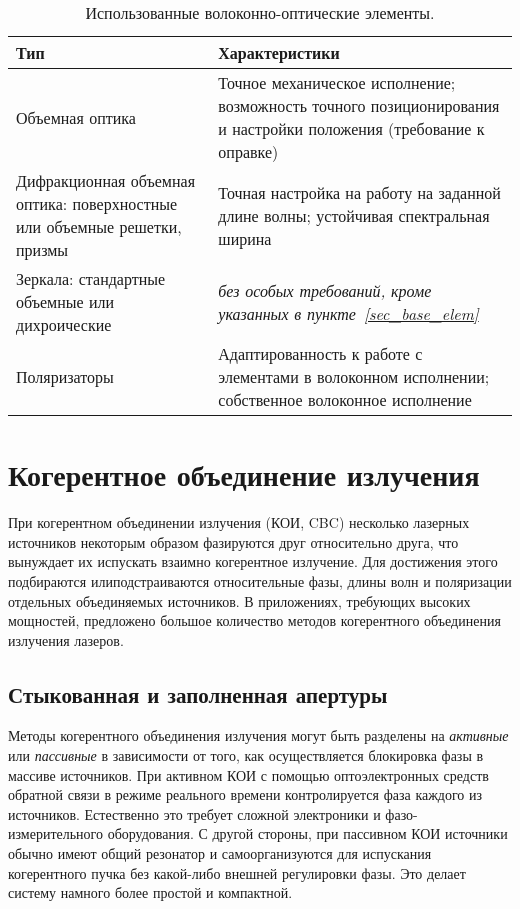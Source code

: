 \begin{table} [htbp]
  \centering
  \parbox{16cm}{\caption{{Использованные волоконно-оптические элементы.}}
  \label{tbl_nrl_4}}
  \begin{center}
  \begin{tabular}{ | p{6cm} | p{9cm} |}
  \hline
  \hline
  Тип & Характеристики \\
  \hline
  \hline
    Объемная оптика & Точное механическое исполнение; возможность точного позиционирования и настройки положения (требование к оправке) \\
  \hline
    Дифракционная объемная оптика: поверхностные или объемные решетки, призмы & Точная настройка на работу на заданной длине волны; устойчивая спектральная ширина \\
  \hline
    Зеркала: стандартные объемные или дихроические & \textit{без особых требований, кроме указанных в пункте~\ref{sec_base_elem}}\\
  \hline
    Поляризаторы & Адаптированность к работе с элементами в волоконном исполнении; собственное волоконное исполнение\\
  \hline
  \end{tabular}
\end{center}
\end{table}

\section{Когерентное объединение излучения}


При когерентном объединении излучения (КОИ, CBC) несколько лазерных источников некоторым образом фазируются друг относительно друга, что вынуждает их испускать взаимно когерентное излучение. Для достижения этого подбираются илиподстраиваются относительные фазы, длины волн и поляризации отдельных объединяемых источников. В приложениях, требующих высоких мощностей, предложено большое количество методов когерентного объединения излучения лазеров.

\subsection{Стыкованная и заполненная апертуры}

Методы когерентного объединения излучения могут быть разделены на \textit{активные} или \textit{пассивные} в зависимости от того, как осуществляется блокировка фазы в массиве источников. При активном КОИ с помощью оптоэлектронных средств обратной связи в режиме реального времени контролируется фаза каждого из источников. Естественно это требует сложной электроники и фазо-измерительного оборудования. С другой стороны, при пассивном КОИ источники обычно имеют общий резонатор и самоорганизуются для испускания когерентного пучка без какой-либо внешней регулировки фазы. Это делает систему намного более простой и компактной.

